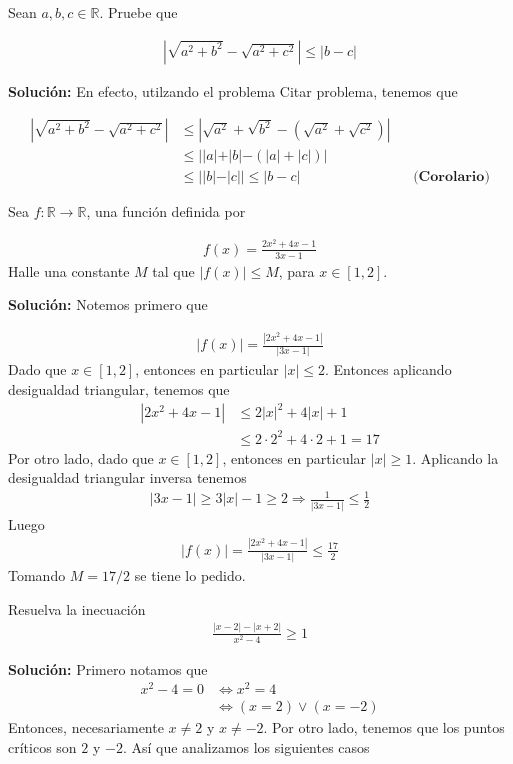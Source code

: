\documentclass[12pt]{book}
\begin{document}
\begin{prob}{}{}
Sean $a,b,c \in \mathbb{R}$. Pruebe que 

\begin{align*}
    \left|\sqrt{a^2+b^2}-\sqrt{a^2+c^2}\right| \leq |b-c|
\end{align*}
\end{prob}
\textbf{Solución:} En efecto, utilzando el problema {\large Citar problema}, tenemos que 

\begin{align*}
    \left|\sqrt{a^2+b^2}-\sqrt{a^2+c^2}\right| &\leq   \left| \sqrt{a^2}+\sqrt{b^2}-\left(\sqrt{a^2}+\sqrt{c^2}\right)\right| \\
    &\leq ||a|+|b|-(|a|+|c|)| \\
    &\leq | |b|-|c|| \leq |b-c| && \textbf{(Corolario)}
\end{align*}

\begin{prob}{}{}
Sea $f: \mathbb{R} \to \mathbb{R}$, una función definida por

\begin{align*}
    f(x)=\frac{2x^2+4x-1}{3x-1}
\end{align*}
Halle una constante $M$ tal que $|f(x)| \leq M$, para $x \in [1,2]$.
\end{prob}
\textbf{Solución:}
Notemos primero que 

\begin{align*}
    |f(x)|= \frac{|2x^2+4x-1|}{|3x-1|}
\end{align*}
Dado que $x \in [1,2]$, entonces en particular $|x|\leq 2$. Entonces aplicando desigualdad triangular, tenemos que 
\begin{align*}
    |2x^2+4x-1|&\leq 2|x|^2+4|x|+1 \\
    &\leq2\cdot 2^2+4\cdot 2 +1 = 17 
\end{align*}
Por otro lado, dado que   $x \in [1,2]$, entonces en particular $|x| \geq 1 $. Aplicando la desigualdad triangular inversa tenemos 
\begin{align*}
    |3x-1| \geq 3|x|-1\geq 2 \Longrightarrow \frac{1}{|3x-1|} \leq \frac{1}{2}
\end{align*}
Luego
\begin{align*}
     |f(x)|= \frac{|2x^2+4x-1|}{|3x-1|}\leq \frac{17}{2}
\end{align*}
Tomando $M=17/2$ se tiene lo pedido.

\begin{prob}{}{}
    Resuelva la inecuación 
    \begin{align*}
        \frac{|x-2|-|x+2|}{x^2-4} \geq 1
    \end{align*}
\end{prob}
\textbf{Solución:} 
Primero notamos que 
\begin{align*}
    x^2-4=0 &\Longleftrightarrow x^2 =4 \\
    &\Longleftrightarrow (x=2) \vee (x=-2)
\end{align*}
Entonces, necesariamente $x\neq 2$ y $x\neq -2$. Por otro lado, tenemos que los puntos críticos son $2$ y $-2$. Así que analizamos los siguientes casos
\end{document}
